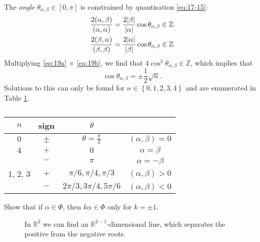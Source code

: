 The \emph{angle} $\theta_{\alpha, \beta} \in [0, \pi]$ is constrained by quantisation \eqref{eq:17-15}:
\begin{subequations}
  \begin{align}
    \frac{2 (\alpha, \beta)}{(\alpha, \alpha)} &= \frac{2 \abs{\beta}}{\abs{ \alpha}} \cos \theta_{\alpha, \beta} \in \mathbb{Z} \label{eq:19a} \\
    \frac{2 (\beta , \alpha)}{(\beta, \beta)} &= \frac{2 \abs{\alpha}}{\abs{\beta}} \cos \theta_{\alpha, \beta} \in \mathbb{Z} \label{eq:19b}
  \end{align}
\end{subequations}
Multiplying \eqref{eq:19a} $\times$ \eqref{eq:19b}, we find that $4 \cos^2 \theta_{\alpha, \beta} \in \mathbb{Z}$, which implies that
\begin{equation}
  \cos\theta_{\alpha, \beta} = \pm \frac{1}{2} \sqrt{n}.
\end{equation}
Solutions to this can only be found for $n \in \left\{ 0, 1, 2, 3, 4 \right\}$ and are enumerated in Table \ref{tab:18-1}.
\begin{table}[btp]
  \centering
  \begin{tabular}{|c|c|c|c|}
    \hline
    $n$ & sign & $\theta$ &  \\
    \hline
    $0$ & $\pm$ & $\theta = \frac{\pi}{2}$ & $(\alpha, \beta) = 0$ \\
    $4$ & $+$ & $0$ & $\alpha = \beta$ \\
	& $-$ & $\pi$ & $\alpha = -\beta$ \\
    1, 2, 3 & $+$ & $\pi / 6, \pi/4, \pi/3$ & $(\alpha, \beta) > 0$ \\
	    & $-$ & $2\pi/3, 3 \pi/4, 5 \pi / 6$ & $(\alpha, \beta) <0$ \\
    \hline
  \end{tabular}
  \caption{}
  \label{tab:18-1}
\end{table}

\begin{exercise}
  Show that if $\alpha \in \Phi$, then  $k \alpha \in \Phi$ only for  $k = \pm 1$.
\end{exercise}

\begin{figure}[tbph]
  \centering
  \def\svgwidth{0.5\columnwidth}
  
  \caption{In $\mathbb{R}^2$ we can find an $\mathbb{R}^{2-1}$-dimensional line, which separates the positive from the negative roots.}
  \label{fig:l18f2}
\end{figure}

